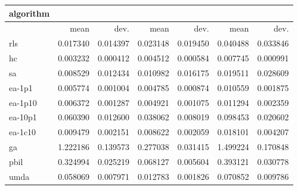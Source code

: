 \begin{tabular}{@{}l*{6}{>{{}}N{1}{2}}@{}}
\toprule
{algorithm} &  &  &  \\
\midrule
& {mean} & {dev.} & {mean} & {dev.} & {mean} & {dev.} \\
\midrule
rls & 0.017340 & 0.014397 & 0.023148 & 0.019450 & 0.040488 & 0.033846 \\
 hc & 0.003232 & 0.000412 & 0.004512 & 0.000584 & 0.007745 & 0.000991 \\
 sa & 0.008529 & 0.012434 & 0.010982 & 0.016175 & 0.019511 & 0.028609 \\
 ea-1p1 & 0.005774 & 0.001004 & 0.004785 & 0.000874 & 0.010559 & 0.001875 \\
 ea-1p10 & 0.006372 & 0.001287 & 0.004921 & 0.001075 & 0.011294 & 0.002359 \\
 ea-10p1 & 0.060390 & 0.012600 & 0.038062 & 0.008019 & 0.098453 & 0.020602 \\
 ea-1c10 & 0.009479 & 0.002151 & 0.008622 & 0.002059 & 0.018101 & 0.004207 \\
 ga & 1.222186 & 0.139573 & 0.277038 & 0.031415 & 1.499224 & 0.170848 \\
 pbil & 0.324994 & 0.025219 & 0.068127 & 0.005604 & 0.393121 & 0.030778 \\
 umda & 0.058069 & 0.007971 & 0.012783 & 0.001826 & 0.070852 & 0.009786 \\
 \bottomrule
\end{tabular}
